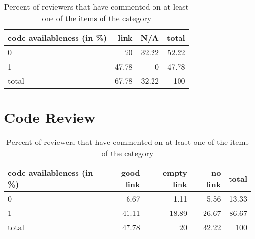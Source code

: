 \documentclass{article}
\begin{document}
\begin{table}[H]

\centering

\begin{tabular}{lrrr}
\hline
 code availableness (in \%)   &   link &   N/A &   total \\
\hline
 0                           &  20    & 32.22 &   52.22 \\
 1                           &  47.78 &  0    &   47.78 \\
 total                       &  67.78 & 32.22 &  100    \\
\hline
\end{tabular}\caption{Percent of reviewers that have commented on at least one of the items of the category}

\end{table}



\section{Code Review} 

\begin{table}[H]

\centering

\begin{tabular}{lrrrr}
\hline
 code availableness (in \%)   &   good link &   empty link &   no link &   total \\
\hline
 0                           &        6.67 &         1.11 &      5.56 &   13.33 \\
 1                           &       41.11 &        18.89 &     26.67 &   86.67 \\
 total                       &       47.78 &        20    &     32.22 &  100    \\
\hline
\end{tabular}\caption{Percent of reviewers that have commented on at least one of the items of the category}

\end{table}
\end{document}
